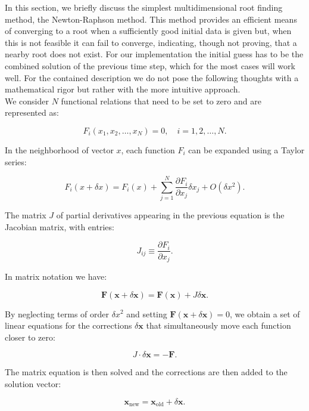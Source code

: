 \documentclass{article}
\begin{document}
In this section, we briefly discuss the simplest multidimensional root finding
method, the Newton-Raphson method. This method provides an efficient means of
converging to a root when a sufficiently good initial data is given but, when this is not feasible it can fail to converge, indicating, though not proving, that a nearby root does not exist. For our implementation the initial guess has to be the combined solution of the previous time step, which for the most cases will work well. For the contained description we do not pose the following thoughts with a mathematical rigor but rather with the more intuitive approach.\\

We consider $N$ functional relations that need to be set to zero and are represented as:

\[
F_i(x_1, x_2, \ldots, x_N) = 0, \quad i = 1, 2, \ldots, N. \label{eq:functional_relations}
\]


In the neighborhood of vector $x$, each function $F_i$ can be expanded using a Taylor series:

\[
F_i(x + \delta x) = F_i(x) + \sum_{j=1}^{N} \frac{\partial F_i}{\partial x_j} \delta x_j + O(\delta x^2). \label{eq:taylor_series}
\]

The matrix $J$ of partial derivatives appearing in the previous equation is the Jacobian matrix, with entries:

\[
J_{ij} \equiv \frac{\partial F_i}{\partial x_j}. \label{eq:jacobian_matrix}
\]

In matrix notation we have:

\[
\mathbf{F}(\mathbf{x} + \delta \mathbf{x}) = \mathbf{F}(\mathbf{x}) + J \delta \mathbf{x}. \label{eq:matrix_notation}
\]

By neglecting terms of order $\delta x^2$ and setting $\mathbf{F}(\mathbf{x} + \delta \mathbf{x}) = 0$, we obtain a set of linear equations for the corrections $\delta \mathbf{x}$ that simultaneously move each function closer to zero:

\[
J \cdot \delta \mathbf{x} = -\mathbf{F}. \label{eq:linear_equations}
\]

The matrix equation is then solved and the corrections are then added to the solution vector:

\[
\mathbf{x}_{\text{new}} = \mathbf{x}_{\text{old}} + \delta \mathbf{x}. \label{eq:solution_update}
\]
\end{document}
